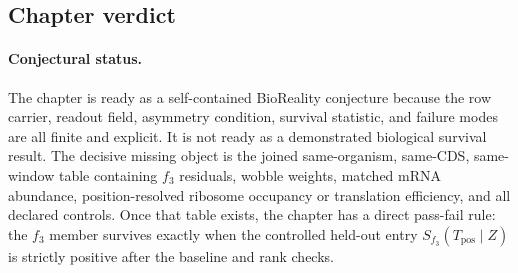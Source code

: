 \subsection{Chapter verdict}
\label{sec:q6-f3-stress-verdict}

\paragraph{Conjectural status.}
The chapter is ready as a self-contained BioReality conjecture because the row carrier, readout field, asymmetry condition, survival statistic, and failure modes are all finite and explicit.  It is not ready as a demonstrated biological survival result.  The decisive missing object is the joined same-organism, same-CDS, same-window table containing $f_3$ residuals, wobble weights, matched mRNA abundance, position-resolved ribosome occupancy or translation efficiency, and all declared controls.  Once that table exists, the chapter has a direct pass-fail rule: the $f_3$ member survives exactly when the controlled held-out entry $S_{f_3}(T_{\mathrm{pos}}\mid Z)$ is strictly positive after the baseline and rank checks.
